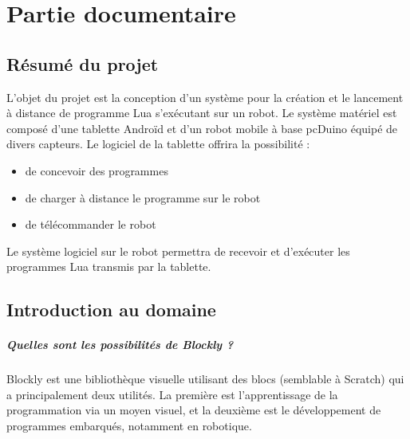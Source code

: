 \documentclass[12pt,francais]{report}
\begin{document}
	
		
		
\tableofcontents


		
\chapter*{Partie documentaire}	


\section*{Résumé du projet}	


L’objet du projet est la conception d'un système pour la création et le lancement à distance de programme Lua s'exécutant sur un robot. Le système matériel est composé d'une tablette Androïd et d'un robot mobile à base pcDuino équipé de divers capteurs. Le logiciel de la tablette offrira la possibilité : 
\begin{itemize}
\item de concevoir des programmes
\item de charger à distance le programme sur le robot 
\item de télécommander le robot 
\end{itemize} 
Le système logiciel sur le robot permettra de recevoir et d'exécuter les programmes Lua transmis par la tablette.
		
\newpage 
\section*{Introduction au domaine}

\paragraph*{Quelles sont les possibilités de Blockly ?\\}

Blockly est une bibliothèque visuelle utilisant des blocs (semblable à Scratch) qui a principalement deux utilités. La première est l'apprentissage de la programmation via un moyen visuel, et la deuxième est le développement de programmes embarqués, notamment en robotique.
	
\end{document}
